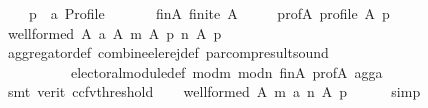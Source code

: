 \begin{isabellebody}
\ \ \ \ p\ {\isacharcolon}{\kern0pt}{\isacharcolon}{\kern0pt}\ {\isachardoublequoteopen}{\isacharprime}{\kern0pt}a\ Profile{\isachardoublequoteclose}\isanewline
\ \ \isamarkupfalse%
\isanewline
\ \ \ \ fin{\isacharunderscore}{\kern0pt}A{\isacharcolon}{\kern0pt}\ {\isachardoublequoteopen}finite\ A{\isachardoublequoteclose}\ \isanewline
\ \ \ \ prof{\isacharunderscore}{\kern0pt}A{\isacharcolon}{\kern0pt}\ {\isachardoublequoteopen}profile\ A\ p{\isachardoublequoteclose}\isanewline
\ \ \isamarkupfalse%
\ {\isachardoublequoteopen}well{\isacharunderscore}{\kern0pt}formed\ A\ {\isacharparenleft}{\kern0pt}a\ A\ {\isacharparenleft}{\kern0pt}m\ A\ p{\isacharparenright}{\kern0pt}\ {\isacharparenleft}{\kern0pt}n\ A\ p{\isacharparenright}{\kern0pt}{\isacharparenright}{\kern0pt}{\isachardoublequoteclose}\isanewline
\ \ \ \ \isamarkupfalse%
\ aggregator{\isacharunderscore}{\kern0pt}def\ combine{\isacharunderscore}{\kern0pt}ele{\isacharunderscore}{\kern0pt}rej{\isacharunderscore}{\kern0pt}def\ par{\isacharunderscore}{\kern0pt}comp{\isacharunderscore}{\kern0pt}result{\isacharunderscore}{\kern0pt}sound\isanewline
\ \ \ \ \ \ \ \ \ \ electoral{\isacharunderscore}{\kern0pt}module{\isacharunderscore}{\kern0pt}def\ mod{\isacharunderscore}{\kern0pt}m\ mod{\isacharunderscore}{\kern0pt}n\ fin{\isacharunderscore}{\kern0pt}A\ prof{\isacharunderscore}{\kern0pt}A\ agg{\isacharunderscore}{\kern0pt}a\isanewline
\ \ \ \ \isamarkupfalse%
\ {\isacharparenleft}{\kern0pt}smt\ {\isacharparenleft}{\kern0pt}verit{\isacharcomma}{\kern0pt}\ ccfv{\isacharunderscore}{\kern0pt}threshold{\isacharparenright}{\kern0pt}{\isacharparenright}{\kern0pt}\isanewline
\ \ \isamarkupfalse%
\ {\isachardoublequoteopen}well{\isacharunderscore}{\kern0pt}formed\ A\ {\isacharparenleft}{\kern0pt}{\isacharparenleft}{\kern0pt}m\ {\isasymparallel}\isactrlsub a\ n{\isacharparenright}{\kern0pt}\ A\ p{\isacharparenright}{\kern0pt}{\isachardoublequoteclose}\isanewline
\ \ \ \ \isamarkupfalse%
\ simp\isanewline
{}\isamarkupfalse%
%
\endisatagproof
{\isafoldproof}%
%
\isadelimproof
\isanewline
%
\endisadelimproof
%
\isadelimtheory
\isanewline
%
\endisadelimtheory
%
\isatagtheory
{}\isamarkupfalse%
%
\endisatagtheory
{\isafoldtheory}%
%
\isadelimtheory
%
\endisadelimtheory
%
\end{isabellebody}%
\endinput
